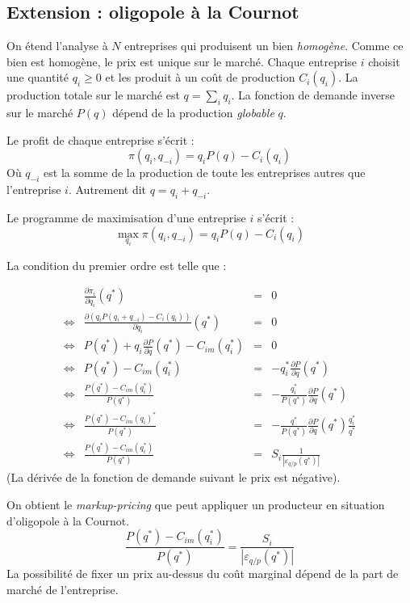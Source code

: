 \documentclass[
]{book}
\theoremstyle{definition}
\theoremstyle{definition}
\theoremstyle{definition}
\theoremstyle{definition}
\theoremstyle{remark}
\begin{document}
\hypertarget{extension-oligopole-uxe0-la-cournot}{%
\subsection{Extension : oligopole à la Cournot}\label{extension-oligopole-uxe0-la-cournot}}

On étend l'analyse à \(N\) entreprises qui produisent un bien \emph{homogène}.
Comme ce bien est homogène, le prix est unique sur le marché.
Chaque entreprise \(i\) choisit une quantité \(q_i\geq 0\) et les produit à un coût de production \(C_i(q_i)\).
La production totale sur le marché est \(q=\sum_i q_i\).
La fonction de demande inverse sur le marché \(P(q)\) dépend de la production \emph{globable} \(q\).

Le profit de chaque entreprise s'écrit :
\[
\pi(q_i, q_{-i}) = q_iP(q) -C_i(q_i)
\]
Où \(q_{-i}\) est la somme de la production de toute les entreprises autres que l'entreprise \(i\).
Autrement dit \(q=q_i+q_{-i}\).

Le programme de maximisation d'une entreprise \(i\) s'écrit :
\[
\max_{q_i}\pi(q_i, q_{-i}) = q_iP(q) -C_i(q_i)
\]

La condition du premier ordre est telle que :

\[
\begin{array}{crcl}
&\frac{\partial \pi_i}{\partial q_i}(q^*) &=& 0\\
\Leftrightarrow & \frac{\partial  \left(q_iP(q_i+q_{-i}) -C_i(q_i)\right)}{\partial q_i}(q^*) &= &0\\
\Leftrightarrow & P(q^*) + q_i\frac{\partial  P}{\partial q}(q^*) -C_{im}(q_i^*)&= &0\\
\Leftrightarrow & P(q^*) - C_{im}(q_i^*)&= &-q_i^*\frac{\partial  P}{\partial q}(q^*) \\
\Leftrightarrow & \frac{P(q^*)-C_{im}(q_i^*)}{P(q^*)}&= &-\frac{q_i^*}{P(q^*)}\frac{\partial  P}{\partial q}(q^*) \\
\Leftrightarrow & \frac{P(q^*) -C_{im}(q_i)^*}{P(q^*)}&= &-\frac{q^*}{P(q^*)}\frac{\partial  P}{\partial q}(q^*)\frac{q_i^*}{q^*} \\
\Leftrightarrow & \frac{P(q^*) - C_{im}(q_i^*)}{P(q^*)}&= &S_i\frac{1}{\left|\varepsilon_{q/p}(q^*)\right|}
\end{array}
\]
(La dérivée de la fonction de demande suivant le prix est négative).

On obtient le \emph{markup-pricing} que peut appliquer un producteur en situation d'oligopole à la Cournot.
\[\frac{P(q^*) -C_{im}(q_i^*)}{P(q^*)}= \frac{S_i}{\left|\varepsilon_{q/p}(q^*)\right|}\]
La possibilité de fixer un prix au-dessus du coût marginal dépend de la part de marché de l'entreprise.
\end{document}
